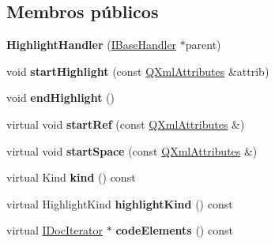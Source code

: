 \subsection*{Membros públicos}
\begin{DoxyCompactItemize}
\item 
\hypertarget{class_highlight_handler_af48cb6c9cd3afdb2d23c166623c598aa}{{\bfseries Highlight\-Handler} (\hyperlink{class_i_base_handler}{I\-Base\-Handler} $\ast$parent)}\label{class_highlight_handler_af48cb6c9cd3afdb2d23c166623c598aa}

\item 
\hypertarget{class_highlight_handler_a50ea02cd8ee243f8af6f3e9008caa6bc}{void {\bfseries start\-Highlight} (const \hyperlink{class_q_xml_attributes}{Q\-Xml\-Attributes} \&attrib)}\label{class_highlight_handler_a50ea02cd8ee243f8af6f3e9008caa6bc}

\item 
\hypertarget{class_highlight_handler_ad3afc000b762971700fd9d3491bd95a7}{void {\bfseries end\-Highlight} ()}\label{class_highlight_handler_ad3afc000b762971700fd9d3491bd95a7}

\item 
\hypertarget{class_highlight_handler_a0a6ad84c50fcae905559fdcc3ca40e3c}{virtual void {\bfseries start\-Ref} (const \hyperlink{class_q_xml_attributes}{Q\-Xml\-Attributes} \&)}\label{class_highlight_handler_a0a6ad84c50fcae905559fdcc3ca40e3c}

\item 
\hypertarget{class_highlight_handler_a4cec6c7d6be6552dcef5816b2fee3ec4}{virtual void {\bfseries start\-Space} (const \hyperlink{class_q_xml_attributes}{Q\-Xml\-Attributes} \&)}\label{class_highlight_handler_a4cec6c7d6be6552dcef5816b2fee3ec4}

\item 
\hypertarget{class_highlight_handler_af8e62c8a81ddf2283205cc8955de50eb}{virtual Kind {\bfseries kind} () const }\label{class_highlight_handler_af8e62c8a81ddf2283205cc8955de50eb}

\item 
\hypertarget{class_highlight_handler_ae3456514a4f6be5b93fdb01f6435ad2b}{virtual Highlight\-Kind {\bfseries highlight\-Kind} () const }\label{class_highlight_handler_ae3456514a4f6be5b93fdb01f6435ad2b}

\item 
\hypertarget{class_highlight_handler_ad94162a254e317a5e8331e7a15f8199f}{virtual \hyperlink{class_i_doc_iterator}{I\-Doc\-Iterator} $\ast$ {\bfseries code\-Elements} () const }\label{class_highlight_handler_ad94162a254e317a5e8331e7a15f8199f}

\end{DoxyCompactItemize}
